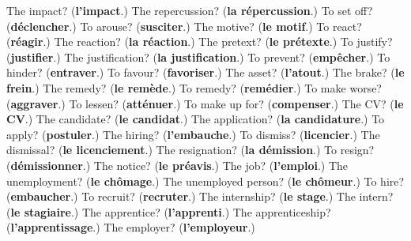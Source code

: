 \begin{tcolorbox}[breakable,colback=teal!4,colframe=teal!35!black,title={Before you move on}]
The impact? (\textbf{l'impact}.) The repercussion? (\textbf{la répercussion}.) To set off? (\textbf{déclencher}.) To arouse? (\textbf{susciter}.) The motive? (\textbf{le motif}.) To react? (\textbf{réagir}.) The reaction? (\textbf{la réaction}.) The pretext? (\textbf{le prétexte}.) To justify? (\textbf{justifier}.) The justification? (\textbf{la justification}.) To prevent? (\textbf{empêcher}.) To hinder? (\textbf{entraver}.) To favour? (\textbf{favoriser}.) The asset? (\textbf{l'atout}.) The brake? (\textbf{le frein}.) The remedy? (\textbf{le remède}.) To remedy? (\textbf{remédier}.) To make worse? (\textbf{aggraver}.) To lessen? (\textbf{atténuer}.) To make up for? (\textbf{compenser}.) The CV? (\textbf{le CV}.) The candidate? (\textbf{le candidat}.) The application? (\textbf{la candidature}.) To apply? (\textbf{postuler}.) The hiring? (\textbf{l'embauche}.) To dismiss? (\textbf{licencier}.) The dismissal? (\textbf{le licenciement}.) The resignation? (\textbf{la démission}.) To resign? (\textbf{démissionner}.) The notice? (\textbf{le préavis}.) The job? (\textbf{l'emploi}.) The unemployment? (\textbf{le chômage}.) The unemployed person? (\textbf{le chômeur}.) To hire? (\textbf{embaucher}.) To recruit? (\textbf{recruter}.) The internship? (\textbf{le stage}.) The intern? (\textbf{le stagiaire}.) The apprentice? (\textbf{l'apprenti}.) The apprenticeship? (\textbf{l'apprentissage}.) The employer? (\textbf{l'employeur}.)
\end{tcolorbox}
